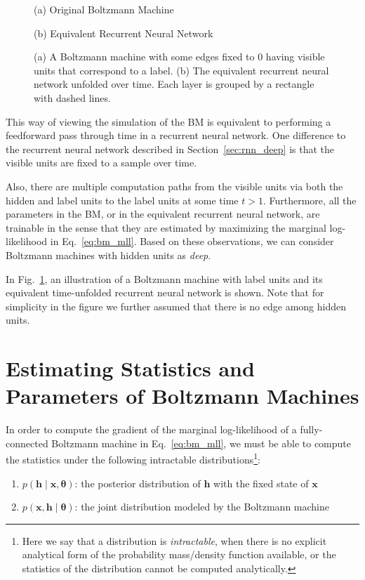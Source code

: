 \documentclass{now}
\newcommand{\vect}[1]{\mathbf{#1}}
\newcommand{\vects}[1]{\boldsymbol{#1}}
\newcommand{\vh}[0]{\vect{h}}
\newcommand{\vx}[0]{\vect{x}}
\newcommand{\TT}[0]{{\vects{\theta}}}
\begin{document}
\begin{figure}[t]
    \vspace{2mm}
    \begin{minipage}{0.48\textwidth}
        \centering
        \small
        (a) Original Boltzmann Machine
    \end{minipage}
    \begin{minipage}{0.48\textwidth}
        \centering
        \small
        (b) Equivalent Recurrent Neural Network
    \end{minipage}
    \caption{(a) A Boltzmann machine with some edges fixed
    to $0$ having visible units that correspond to a label.
    (b) The equivalent recurrent neural network unfolded over
    time. Each layer is grouped by a rectangle with dashed
    lines.}
    \label{fig:bm_rnn}
\end{figure}

This way of viewing the simulation of the BM is equivalent to
performing a feedforward pass through time in a recurrent neural
network. One difference to the recurrent neural network described
in Section~\ref{sec:rnn_deep} is that the visible units are fixed
to a sample over time. 

Also, 
there are multiple computation
paths from the visible units via both the hidden and label
units to the label units at some time $t > 1$. Furthermore,
all the parameters in the BM, or in the equivalent recurrent
neural network, are trainable in the sense that they are
estimated by maximizing the marginal log-likelihood in
Eq.~\eqref{eq:bm_mll}. Based on these observations, we
can consider Boltzmann machines with hidden units
as \textit{deep}.

In Fig.~\ref{fig:bm_rnn}, an illustration of a Boltzmann
machine with label units and its equivalent time-unfolded
recurrent neural network is shown. Note that for
simplicity in the figure we further assumed that there is
no edge among hidden units.


\section{Estimating Statistics and Parameters of Boltzmann
Machines}
\label{sec:estimation_bm}

In order to compute the gradient of the marginal
log-likelihood of a fully-connected Boltzmann machine in
Eq.~\eqref{eq:bm_mll}, we must be able to compute the
statistics under the following intractable
distributions\footnote{Here we say that a distribution is
\textit{intractable}, when there is no explicit analytical
form of the probability mass/density function available, or
the statistics of the distribution cannot be computed
analytically.}:
\begin{enumerate}
    \itemsep 0em
    \item $p(\vh \mid \vx, \TT)$: the posterior distribution
        of $\vh$ with the fixed state of $\vx$
    \item $p(\vx, \vh \mid \TT)$: the joint distribution
        modeled by the Boltzmann machine
\end{enumerate}
\end{document}

